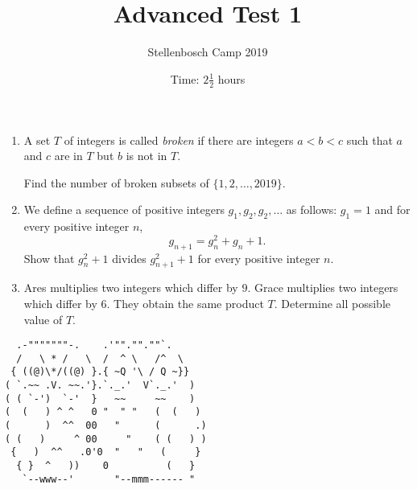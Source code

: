 \documentclass{article}
\title{Advanced Test 1}
\author{Stellenbosch Camp 2019}
\date{Time: $2\frac{1}{2}$ hours}
\begin{document}
\maketitle
\thispagestyle{empty}


\begin{enumerate}[1.]

\item %
A set $T$ of integers is called \emph{broken} if there are integers $a < b < c$ such that $a$ and $c$ are in $T$ but $b$ is not in $T$.

Find the number of broken subsets of $\{1, 2, \dotsc, 2019\}$.


\item %
We define a sequence of positive integers $g_1, g_2, g_2, \dotsc$ as follows: $g_1 = 1$ and for every positive integer $n$,
\[ g_{n+1} = g_n^2 +g_n +1. \]
Show that $g_n^2+1$ divides $g_{n+1}^2+1$ for every positive integer $n$.


\item %
Ares multiplies two integers which differ by $9$.
Grace multiplies two integers which differ by $6$.
They obtain the same product $T$.
Determine all possible value of $T$.

\end{enumerate}


\vfill
\centering
\begin{BVerbatim}
  .-"""""""-.    .'""."".""`.
  /   \ * /   \  /  ^ \   /^  \
 { ((@)\*/((@) }.{ ~Q '\ / Q ~}}
( `.~~ .V. ~~.'}.`._.'  V`._.'  )
( ( `-')  `-'  }   ~~     ~~    )
(  (   ) ^ ^   0 "  " "   (  (   )
(      )  ^^  00   "      (      .)
( (   )     ^ 00     "    ( (   ) )
 {   )  ^^   .0'0  "   "   (     }
  { }  ^   ))    0          (   }
   `--www--'       "--mmm------ "    
\end{BVerbatim}
\end{document}
